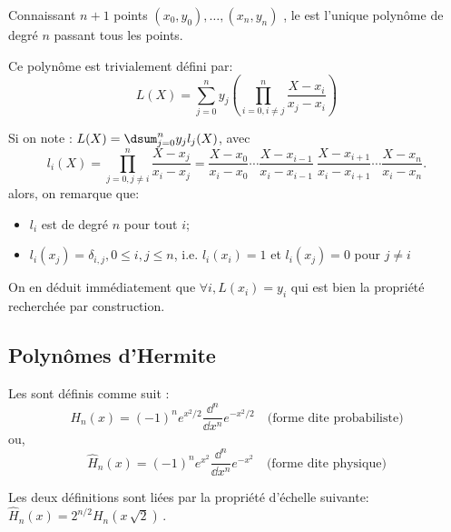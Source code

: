 Connaissant $n + 1$ points $(x_0, y_0),\dots,(x_n, y_n)$ , le 
est l'unique polynôme de degré $n$
passant tous les points.

Ce polynôme est trivialement défini par:
\begin{equation}
L(X) = \sum_{j=0}^{n} y_j \left( \prod_{i=0, i\neq j}^{n} \frac{X-x_i}{x_j-x_i} \right) 
\end{equation}

\medskip
Si on note : $L(X) = \dsum_{j=0}^{n} y_j l_j(X)$, avec
\begin{equation}
l_i(X) = \prod_{j=0, j\neq i}^{n} \frac{X-x_j}{x_i-x_j} = \frac{X-x_0}{x_i-x_0} \cdots \frac{X-x_{i-1}}{x_i-x_{i-1}} ~ \frac{X-x_{i+1}}{x_i-x_{i+1}} \cdots \frac{X-x_{n}}{x_i-x_{n}}.
\end{equation}
alors, on remarque que:
\begin{itemize}
   \item $l_i$ est de degré $n$ pour tout $i$;
   \item $l_i(x_j) = \delta_{i,j}, 0 \leq i,j \leq n$, i.e. $l_i(x_i) = 1$ et $l_i(x_j) = 0$ pour $j\ne i$
\end{itemize}

On en déduit immédiatement que $\forall i, L(x_i) = y_i$ qui est bien la propriété
recherchée par construction.




\medskip
\subsection{Polynômes d'Hermite}

Les  
sont définis comme suit :
\begin{equation}
    H_n(x)=(-1)^n e^{x^2/2}\frac{\dd^n}{\dd x^n}e^{-x^2/2} \quad \text{(forme dite probabiliste)}
\end{equation}
ou,
\begin{equation}
    \widehat{H}_n(x)=(-1)^n e^{x^2}\frac{\dd^n}{\dd x^n}e^{-x^2} \quad \text{(forme dite physique)}
\end{equation}

Les deux définitions sont liées par la propriété d'échelle suivante: 
$\widehat{H}_n(x) = 2^{n/2}H_n \left(x\,\sqrt{2} \right)\,\!.$


